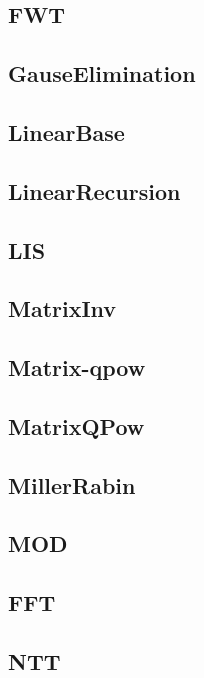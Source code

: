 \documentclass{article}
\begin{document}
\subsection{FWT}

\subsection{GauseElimination}

\subsection{LinearBase}

\subsection{LinearRecursion}

\subsection{LIS}

\subsection{MatrixInv}

\subsection{Matrix-qpow}

\subsection{MatrixQPow}

\subsection{MillerRabin}

\subsection{MOD}

\subsection{FFT}

\subsection{NTT}

\end{document}
